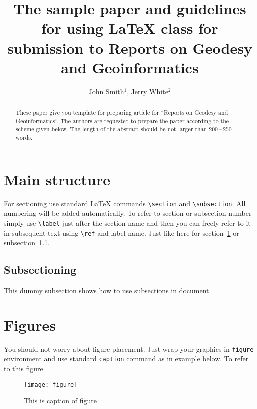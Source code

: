 \documentclass{rog}
\title[The sample paper\ldots]{The sample paper and guidelines for using \LaTeX{} class for submission to Reports on Geodesy and Geoinformatics}
\author[Smith, J., White, J.]{John Smith$^1$, Jerry White$^2$}
\affiliation{1}
\begin{document}
    \maketitle

    \begin{abstract}
      These paper give you template for preparing article for ``Reports on 
      Geodesy and Geoinformatics''. The authors are requested to prepare the 
      paper according to the scheme given below. The length of the abstract 
      should be not larger than 200\,–\,250 words.
    \end{abstract}


  \section{Main structure}
    \label{labelforsection}
    For sectioning use standard \LaTeX{} commands
    \verb$\section$ and \verb$\subsection$.
    All numbering will be added automatically.
    To refer to section or subsection number
    simply use \verb$\label$ just after the section
    name and then you can freely refer to it in subsequent text
    using \verb$\ref$ and label name.
    Just like here for section~\ref{labelforsection} or
    subsection~\ref{labelforsubsection}.

  \subsection{Subsectioning}
    \label{labelforsubsection}
    This dummy subsection shows how to use subsections in document.

  \section{Figures}
    You should not worry about figure placement.
    Just wrap your graphics in \texttt{figure}
    environment and use standard \texttt{caption}
    command as in example below.
    To refer to this figure
  \begin{figure}
      \texttt{[image: figure]}
      \caption{This is caption of figure}
    \end{figure}
\end{document}
